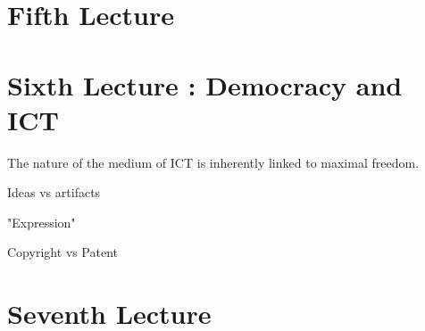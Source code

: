 \documentclass[a4paper]{article}
\begin{document}
\section{Fifth Lecture}
\section{Sixth Lecture : Democracy and ICT}

The nature of the medium of ICT is inherently linked to maximal freedom.

Ideas vs artifacts

"Expression"

Copyright vs Patent



\section{Seventh Lecture}


\end{document}
